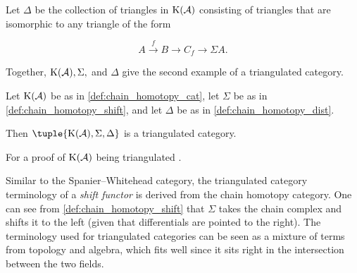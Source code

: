 \begin{definition}
    \label{def:chain_homotopy_dist}
    Let \( \Delta \) be the collection of triangles in \( \operatorname{K}({\mathcal{A}}) \) consisting of triangles that are isomorphic to any triangle of the form

    \[
        A \stackrel{f}{\to} B \to C_f \to \Sigma A.
    \]
\end{definition}

Together, \( \operatorname{K}({\mathcal{A}}), \Sigma, \) and \( \Delta \) give the second example of a triangulated category.

\begin{example}
    Let \( \operatorname{K}({\mathcal{A}}) \) be as in \autoref{def:chain_homotopy_cat}, let \( \Sigma \) be as in \autoref{def:chain_homotopy_shift}, and let \( \Delta \) be as in \autoref{def:chain_homotopy_dist}.

    Then \( \tuple{\K(\Ac), \Sigma, \Delta} \) is a triangulated category.
\end{example}
For a proof of \( \operatorname{K}({\mathcal{A}}) \) being triangulated \cite[Proposition 3.5.25]{Zimmermann_2014}.

Similar to the Spanier--Whitehead category, the triangulated category terminology of a \emph{shift functor} is derived from the chain homotopy category. One can see from \autoref{def:chain_homotopy_shift} that \( \Sigma \) takes the chain complex and shifts it to the left (given that differentials are pointed to the right). The terminology used for triangulated categories can be seen as a mixture of terms from topology and algebra, which fits well since it sits right in the intersection between the two fields.

